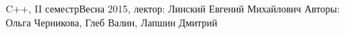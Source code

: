 


\BigHeader
	{C++, II семестр}{Весна 2015, лектор: Линский Евгений Михайлович}
	{Авторы: Ольга Черникова, Глеб Валин, Лапшин Дмитрий}

 




